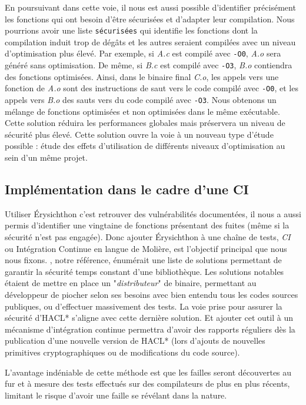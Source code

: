 En poursuivant dans cette voie, il nous est aussi possible d'identifier précisément les fonctions qui ont besoin d'être sécurisées et d'adapter leur compilation. Nous pourrions avoir une liste \texttt{sécurisées} qui identifie les fonctions dont la compilation induit trop de dégâts et les autres seraient compilées avec un niveau d'optimisation plus élevé. Par exemple, si \textit{A.c} est compilé avec \texttt{-O0}, \textit{A.o} sera généré sans optimisation. De même, si \textit{B.c} est compilé avec \texttt{-O3}, \textit{B.o} contiendra des fonctions optimisées. Ainsi, dans le binaire final \textit{C.o}, les appels vers une fonction de \textit{A.o} sont des instructions de saut vers le code compilé avec \texttt{-O0}, et les appels vers \textit{B.o} des sauts vers du code compilé avec \texttt{-O3}. Nous obtenons un mélange de fonctions optimisées et non optimisées dans le même exécutable. Cette solution réduira les performances globales mais préservera un niveau de sécurité plus élevé. Cette solution ouvre la voie à un nouveau type d'étude possible : étude des effets d'utilisation de différents niveaux d'optimisation au sein d'un même projet.\medbreak

\subsection*{Implémentation dans le cadre d'une CI}

Utiliser Érysichthon c'est retrouver des vulnérabilités documentées, il nous a aussi permis d'identifier une vingtaine de fonctions présentant des fuites (même si la sécurité n'est pas engagée). Donc ajouter Érysichthon à une chaîne de tests, \textit{CI} ou Intégration Continue en langue de Molière, est l'objectif principal que nous nous fixons. \citeauthor{schneider2024breakingbadcompilersbreak}, notre référence, énumérait une liste de solutions permettant de garantir la sécurité temps constant d'une bibliothèque. Les solutions notables étaient de mettre en place un "\textit{distributeur}" de binaire, permettant au développeur de piocher selon ses besoins avec bien entendu tous les codes sources publiques, ou d'effectuer massivement des tests. La voie prise pour assurer la sécurité d'HACL* s'aligne avec cette dernière solution. Et ajouter cet outil à un mécanisme d'intégration continue permettra d'avoir des rapports réguliers dès la publication d'une nouvelle version de HACL* (lors d'ajouts de nouvelles primitives cryptographiques ou de modifications du code source).\smallbreak

L'avantage indéniable de cette méthode est que les failles seront découvertes au fur et à mesure des tests effectués sur des compilateurs de plus en plus récents, limitant le risque d'avoir une faille se révélant dans la nature.


